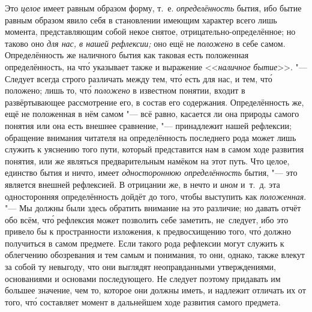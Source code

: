 \label{bkm:bm25a}Это {\em целое} имеет равным образом форму, т.~е.
{\em определённость} бытия, ибо бытие равным образом явило себя в становлении
имеющим характер всего лишь момента, представляющим собой некое снятое,
отрицательно-определённое; но таково
оно {\em для нас, в нашей рефлексии;} оно ещё не {\em положено} в себе самом.
Определённость же наличного бытия как таковая есть положенная определённость,
на чт\'{о} указывает также и выражение <<{\em наличное бытие}>>. "--- Следует
всегда строго различать между тем, чт\'{о} есть для нас, и тем, чт\'{о}
положено; лишь то, чт\'{о} {\em положено} в известном понятии, входит в
развёртывающее рассмотрение его, в состав его содержания. Определённость же,
ещё не положенная в нём самом "--- всё равно, касается ли она природы самого
понятия или она есть внешнее сравнение, "--- принадлежит нашей рефлексии;
обращение внимания читателя на определённость последнего рода может лишь
служить к уяснению того пути, который представится нам в самом ходе развития
понятия, или же являться предварительным намёком на этот путь. Что целое,
единство бытия и ничто, имеет {\em одностороннюю определённость} бытия, "---
это является внешней рефлексией. В отрицании же, в нечто и {\em ином} и~т.~д.
эта односторонняя определённость дойдёт до того, чтобы выступить как
{\em положенная}. "--- Мы должны были здесь обратить внимание на это различие;
но давать отчёт обо всём, чт\'{о} рефлексия может позволить себе заметить,
не~следует, ибо это привело бы к пространности изложения, к предвосхищению
того, чт\'{о} должно получиться в самом предмете. Если такого рода рефлексии
могут служить к облегчению обозревания и тем самым и понимания, то они, однако,
также влекут за собой ту невыгоду, что они выглядят неоправданными
утверждениями, основаниями и основами последующего. Не следует поэтому
придавать им большее значение, чем то, которое они должны иметь, и надлежит
отличать их от того, чт\'{о} составляет момент в дальнейшем ходе развития
самого предмета.

